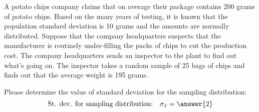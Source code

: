 \documentclass{ximera}
\begin{document}
\begin{problem}\label{pr:chips}
A potato chips company claims that on average their package contains 200 grams of potato chips. Based on the many years of testing, it is known that the population standard deviation is 10 grams and the amounts are normally distributed. Suppose that the company headquarters suspects that the manufacturer is routinely under-filling the packs of chips to cut the production cost. The company headquarters sends an inspector to the plant to find out what’s going on. The inspector takes a random sample of 25 bags of chips and finds out that the average weight is 195 grams. 

\begin{question}
Please determine the value of standard deviation for the sampling distribution:
$$\mbox{St. dev. for sampling distribution:}\quad\sigma_{\bar{x}}= \answer{2}$$
\end{question}


\end{problem}
\end{document}

